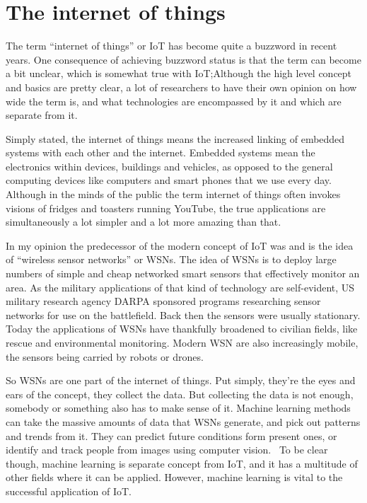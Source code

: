 \section{The internet of things}
\label{sec:iot}

The term ``internet of things'' or IoT has become quite a buzzword in recent
years. One consequence of achieving buzzword status is that the term can become
a bit unclear, which is somewhat true with IoT;\@ Although the high level concept
and basics are pretty clear, a lot of researchers to have their own opinion on
how wide the term is, and what technologies are encompassed by it and which are
separate from it.

Simply stated, the internet of things means the increased linking of embedded
systems with each other and the internet. Embedded systems mean the electronics
within devices, buildings and vehicles, as opposed to the general computing
devices like computers and smart phones that we use every day. Although in the
minds of the public the term internet of things often invokes visions
of fridges and toasters running YouTube, the true applications are
simultaneously a lot simpler and a lot more amazing than that.

In my opinion the predecessor of the modern concept of IoT was and is the idea
of ``wireless sensor networks'' or WSNs. The idea of WSNs is to deploy large
numbers of simple and cheap networked smart sensors that effectively monitor an
area. As the military applications of that kind of technology are self-evident,
US military research agency DARPA sponsored programs researching sensor
networks for use on the battlefield. Back then the sensors were usually
stationary. Today the applications of WSNs have thankfully broadened to
civilian fields, like rescue and environmental monitoring. Modern WSN are also 
increasingly mobile, the sensors being carried by robots or
drones.~\cite{Chong2003}

So WSNs are one part of the internet of things. Put simply, they're the eyes
and ears of the concept, they collect the data. But collecting the data is not
enough, somebody or something also has to make sense of it. Machine learning
methods can take the massive amounts of data that WSNs generate, and pick out
patterns and trends from it. They can predict future conditions form present
ones, or identify and track people from images using computer
vision.~\cite{Gubbi2013} To be clear though, machine learning is separate
concept from IoT, and it has a multitude of other fields where it can be
applied. However, machine learning is vital to the successful application of
IoT.

